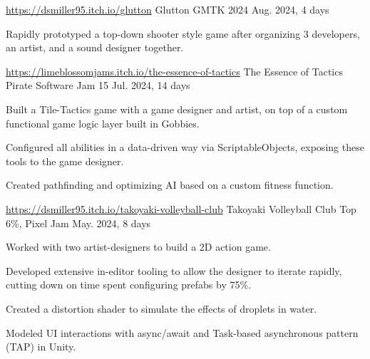 

\begin{cventries}

  \cventry
   {\href{https://dsmiller95.itch.io/glutton}{https://dsmiller95.itch.io/glutton}} %
    {Glutton} %
    {GMTK 2024} %
    {Aug. 2024, 4 days} %
    {
      \begin{cvitems} %
        \item {Rapidly prototyped a top-down shooter style game after organizing 3 developers, an artist, and a sound designer together.}
      \end{cvitems}
    }

  \cventry
   {\href{https://limeblossomjams.itch.io/the-essence-of-tactics}{https://limeblossomjams.itch.io/the-essence-of-tactics}} %
    {The Essence of Tactics} %
    {Pirate Software Jam 15} %
    {Jul. 2024, 14 days} %
    {
      \begin{cvitems} %
        \item {Built a Tile-Tactics game with a game designer and artist, on top of a custom functional game logic layer built in Gobbies.}
        \item {Configured all abilities in a data-driven way via ScriptableObjects, exposing these tools to the game designer.}
        \item {Created pathfinding and optimizing AI based on a custom fitness function.}
      \end{cvitems}
    }

  \cventry
    {\href{https://dsmiller95.itch.io/takoyaki-volleyball-club}{https://dsmiller95.itch.io/takoyaki-volleyball-club}} %
    {Takoyaki Volleyball Club} %
    {Top 6\%, Pixel Jam} %
    {May. 2024, 8 days} %
    {
      \begin{cvitems} %
        \item {Worked with two artist-designers to build a 2D action game.}
        \item {Developed extensive in-editor tooling to allow the designer to iterate rapidly, cutting down on time spent configuring prefabs by 75\%.}
        \item {Created a distortion shader to simulate the effects of droplets in water.}
        \item {Modeled UI interactions with async/await and Task-based asynchronous pattern (TAP) in Unity.}
      \end{cvitems}
    }


\end{cventries}
